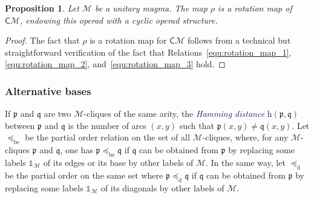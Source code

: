 \documentclass[10pt,reqno]{amsart}
\numberwithin{equation}{subsection}
\newtheorem{Proposition}[Theorem]{Proposition}
\newcommand{\Mca}{\mathcal{M}}
\newcommand{\Pfr}{\mathfrak{p}}
\newcommand{\Qfr}{\mathfrak{q}}
\newcommand{\Cli}{\mathsf{C}}
\newcommand{\Unit}{\mathds{1}}
\newcommand{\Hamming}{\mathrm{h}}
\newcommand{\OrdBE}{\preceq_{\mathrm{be}}}
\newcommand{\OrdD}{\preceq_{\mathrm{d}}}
\newcommand{\Def}[1]{\textcolor{MidnightBlue}{\em #1}}
\begin{document}
\begin{Proposition} \label{prop:cyclic_Cli_M}
    Let $\Mca$ be a unitary magma. The map $\rho$ is a rotation map
    of $\Cli\Mca$, endowing this operad with a cyclic operad structure.
\end{Proposition}
\begin{proof}
    The fact that $\rho$ is a rotation map for $\Cli\Mca$ follows from
    a technical but straightforward verification of the fact that
    Relations~\eqref{equ:rotation_map_1}, \eqref{equ:rotation_map_2},
    and~\eqref{equ:rotation_map_3} hold.
\end{proof}
\medskip

\subsubsection{Alternative bases}
If $\Pfr$ and $\Qfr$ are two $\Mca$-cliques of the same arity, the
\Def{Hamming distance} $\Hamming(\Pfr, \Qfr)$ between $\Pfr$ and $\Qfr$
is the number of arcs $(x, y)$ such that $\Pfr(x, y) \ne \Qfr(x, y)$.
Let $\OrdBE$ be the partial order relation on the set of all
$\Mca$-cliques, where, for any $\Mca$-cliques $\Pfr$ and $\Qfr$, one
has $\Pfr \OrdBE \Qfr$ if $\Qfr$ can be obtained from $\Pfr$ by
replacing some labels $\Unit_\Mca$ of its edges or its base by other
labels of $\Mca$. In the same way, let $\OrdD$ be the partial order
on the same set where $\Pfr \OrdD \Qfr$ if $\Qfr$ can be obtained from
$\Pfr$ by replacing some labels $\Unit_\Mca$ of its diagonals by other
labels of $\Mca$.
\medskip
\end{document}
